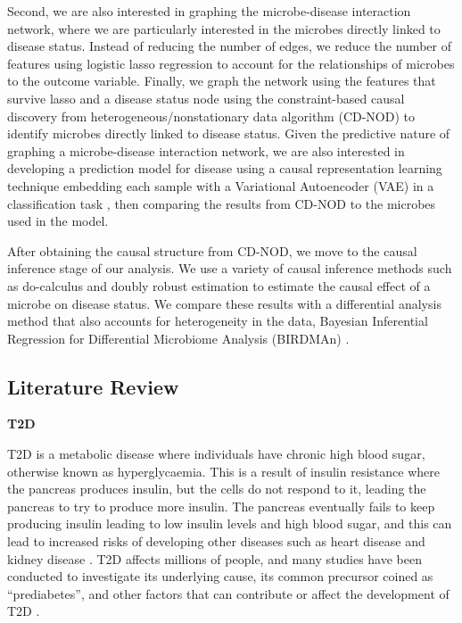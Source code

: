 \documentclass[12pt,letterpaper]{article}
\begin{document}
Second, we are also interested in graphing the microbe-disease interaction network, where we are particularly interested in the microbes directly linked to disease status. Instead of reducing the number of edges, we reduce the number of features using logistic lasso regression to account for the relationships of microbes to the outcome variable. Finally, we graph the network using the features that survive lasso and a disease status node using the constraint-based causal discovery from heterogeneous/nonstationary data algorithm (CD-NOD) \citep{huang2019cdnod} to identify microbes directly linked to disease status. Given the predictive nature of graphing a microbe-disease interaction network, we are also interested in developing a prediction model for disease using a causal representation learning technique embedding each sample with a Variational Autoencoder (VAE) in a classification task \citep{khemakhem2020vaenonlinearica}, then comparing the results from CD-NOD to the microbes used in the model.

After obtaining the causal structure from CD-NOD, we move to the causal inference stage of our analysis. We use a variety of causal inference methods such as do-calculus and doubly robust estimation to estimate the causal effect of a microbe on disease status. We compare these results with a differential analysis method that also accounts for heterogeneity in the data, Bayesian Inferential Regression for Differential Microbiome Analysis (BIRDMAn) \citep{rahman2023birdman}. 

\subsection{Literature Review}

\textbf{T2D}

T2D is a metabolic disease where individuals have chronic high blood sugar, otherwise known as hyperglycaemia. This is a result of insulin resistance where the pancreas produces insulin, but the cells do not respond to it, leading the pancreas to try to produce more insulin. The pancreas eventually fails to keep producing insulin leading to low insulin levels and high blood sugar, and this can lead to increased risks of developing other diseases such as heart disease and kidney disease \citep{adat2d}. T2D affects millions of people, and many studies have been conducted to investigate its underlying cause, its common precursor coined as “prediabetes”, and other factors that can contribute or affect the development of T2D \citep{tabak2012prediabetes, qin2012mgwast2d, mehta2000hcvt2d}. 
\end{document}
